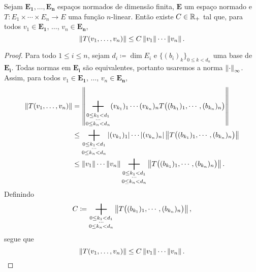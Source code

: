 \begin{prop}
Sejam $\bm{E_1},\dots,\bm{E_n}$ espaços normados de dimensão finita, $\bm{E}$ um espaço normado e $T: E_1 \times \cdots \times E_n \to E$ uma função $n$-linear. Então existe $C \in \mathbb{R}_+$ tal que, para todos $v_1 \in \bm{E_1}$, $\ldots$, $v_n \in \bm{E_n}$,
	\begin{equation*}
	\left\Vert{T(v_1,\ldots,v_n)}\right\Vert \leq C\left\Vert{v_1}\right\Vert\cdots\left\Vert{v_n}\right\Vert.
	\end{equation*}
\end{prop}
\begin{proof}
Para todo $1 \leq i \leq n$, sejam $d_i \coloneqq \dim E_i$ e $\{(b_i)_k\}_{0\leq k<{d_n}}$ uma base de $\bm{E_i}$. Todas normas em $\bm{E_i}$ são equivalentes, portanto usaremos a norma $\left\Vert{\cdot}\right\Vert_\infty$. Assim, para todos $v_1 \in \bm{E_1}$, $\ldots$, $v_n \in \bm{E_n}$,
	\begin{align*}
	\nor{T(v_1,\ldots,v_n)} &= \nor{\bigplus_{\substack{0 \leq k_1 < d_1\\\cdots\\0\leq k_n< d_n}} (v_{k_1})_1\cdots(v_{k_n})_nT\big((b_{k_1})_1,\cdots,(b_{k_n})_n\big)} \\
		&\leq \bigplus_{\substack{0 \leq k_1 < d_1\\\cdots\\0\leq k_n< d_n}} \abs{(v_{k_1})_1}\cdots\abs{(v_{k_n})_n}\nor{T\big((b_{k_1})_1,\cdots,(b_{k_n})_n\big)} \\
		&\leq \nor{v_1}\cdots\nor{v_n}\bigplus_{\substack{0 \leq k_1 < d_1\\\cdots\\0\leq k_n< d_n}} \nor{T\big((b_{k_1})_1,\cdots,(b_{k_n})_n\big)}.
	\end{align*}
Definindo
	\begin{equation*}
	C \coloneqq \bigplus_{\substack{0 \leq k_1 < d_1\\\cdots\\0\leq k_n< d_n}}  \nor{T\big((b_{k_1})_1,\cdots,(b_{k_n})_n\big)},
	\end{equation*}
segue que
	\begin{equation*}
	\left\Vert{T(v_1,\ldots,v_n)}\right\Vert \leq C \left\Vert{v_1}\right\Vert\cdots\left\Vert{v_n}\right\Vert.
	\end{equation*}
\end{proof}



























